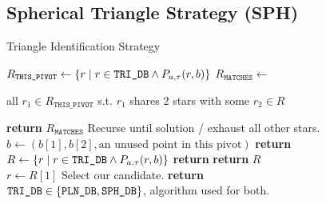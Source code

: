 
\subsection{Spherical Triangle Strategy (SPH)}\label{subsec:sphericalTriangleMethod}
\begin{algorithm}
    \caption{Triangle Identification Strategy} \label{algorithm:triangleIdentification}
    \begin{algorithmic}[1]
        \State $R_\texttt{THIS\_PIVOT} \gets \left\{  r \mid r \in \texttt{TRI\_DB}
        \land P_{a, \tau}(r, b)  \right\}$
        \State $R_\texttt{MATCHES} \gets $ \parbox[t]{0.7\textwidth}{\raggedright all $r_1 \in R_\texttt{THIS\_PIVOT}$ s.t. $r_1$ shares 2 stars with \newline some $r_2 \in R$}
        \State \textbf{return} $R_\texttt{MATCHES}$ 
        \Else \Comment Recurse until solution / exhaust all other stars.
        \State $b \gets \left( b[1], b[2], \text{an unused point in this pivot} \right)$
        \State \textbf{return} 
        \EndIf
        \EndFunction
        \\
    	\State $R \gets \left\{  r \mid r \in \texttt{TRI\_DB} \land P_{a, \tau}(r, b)  \right\}$
    	\State \textbf{return} 
    	\Else
    	\State \textbf{return} $R$
    	\EndIf
    	\EndFunction
        \\
        \State $r \gets R[1]$ \Comment Select our candidate.
        \State \textbf{return} 
        \EndFunction
        \\
        \LineComment $\texttt{TRI\_DB} \in \left\{ \texttt{PLN\_DB}, \texttt{SPH\_DB} \right\}$, algorithm used for both.

\end{algorithmic}
\end{algorithm}
